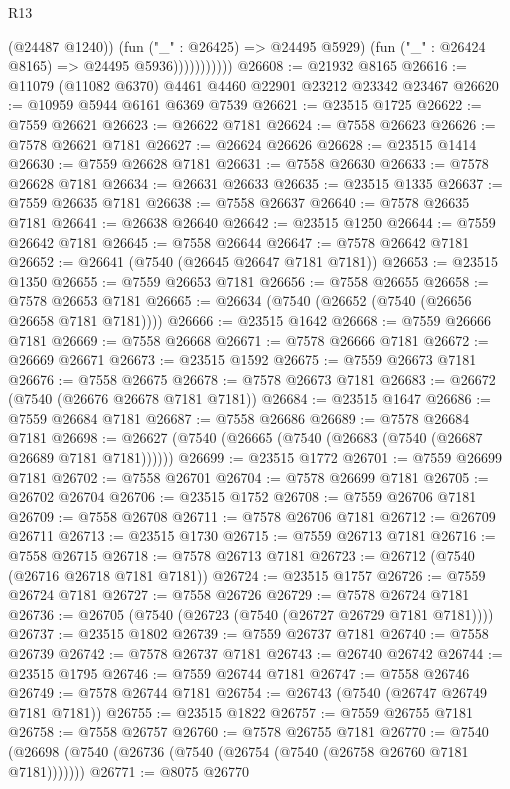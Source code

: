 \begin{lexlean}{R13}
\begin{coremodule}
                          (@24487 @1240))
                        (fun ("_" : @26425) => @24495 @5929)
                        (fun ("_" : @26424 @8165) => @24495 @5936)))))))))))
@26608 := @21932 @8165
@26616 := @11079 (@11082 @6370) @4461 @4460 @22901 @23212 @23342 @23467
@26620 := @10959 @5944 @6161 @6369 @7539
@26621 := @23515 @1725
@26622 := @7559 @26621
@26623 := @26622 @7181
@26624 := @7558 @26623
@26626 := @7578 @26621 @7181
@26627 := @26624 @26626
@26628 := @23515 @1414
@26630 := @7559 @26628 @7181
@26631 := @7558 @26630
@26633 := @7578 @26628 @7181
@26634 := @26631 @26633
@26635 := @23515 @1335
@26637 := @7559 @26635 @7181
@26638 := @7558 @26637
@26640 := @7578 @26635 @7181
@26641 := @26638 @26640
@26642 := @23515 @1250
@26644 := @7559 @26642 @7181
@26645 := @7558 @26644
@26647 := @7578 @26642 @7181
@26652 := @26641 (@7540 (@26645 @26647 @7181 @7181))
@26653 := @23515 @1350
@26655 := @7559 @26653 @7181
@26656 := @7558 @26655
@26658 := @7578 @26653 @7181
@26665 := @26634 (@7540 (@26652 (@7540 (@26656 @26658 @7181 @7181))))
@26666 := @23515 @1642
@26668 := @7559 @26666 @7181
@26669 := @7558 @26668
@26671 := @7578 @26666 @7181
@26672 := @26669 @26671
@26673 := @23515 @1592
@26675 := @7559 @26673 @7181
@26676 := @7558 @26675
@26678 := @7578 @26673 @7181
@26683 := @26672 (@7540 (@26676 @26678 @7181 @7181))
@26684 := @23515 @1647
@26686 := @7559 @26684 @7181
@26687 := @7558 @26686
@26689 := @7578 @26684 @7181
@26698 := @26627 (@7540 (@26665 (@7540 (@26683 (@7540 (@26687 @26689 @7181 @7181))))))
@26699 := @23515 @1772
@26701 := @7559 @26699 @7181
@26702 := @7558 @26701
@26704 := @7578 @26699 @7181
@26705 := @26702 @26704
@26706 := @23515 @1752
@26708 := @7559 @26706 @7181
@26709 := @7558 @26708
@26711 := @7578 @26706 @7181
@26712 := @26709 @26711
@26713 := @23515 @1730
@26715 := @7559 @26713 @7181
@26716 := @7558 @26715
@26718 := @7578 @26713 @7181
@26723 := @26712 (@7540 (@26716 @26718 @7181 @7181))
@26724 := @23515 @1757
@26726 := @7559 @26724 @7181
@26727 := @7558 @26726
@26729 := @7578 @26724 @7181
@26736 := @26705 (@7540 (@26723 (@7540 (@26727 @26729 @7181 @7181))))
@26737 := @23515 @1802
@26739 := @7559 @26737 @7181
@26740 := @7558 @26739
@26742 := @7578 @26737 @7181
@26743 := @26740 @26742
@26744 := @23515 @1795
@26746 := @7559 @26744 @7181
@26747 := @7558 @26746
@26749 := @7578 @26744 @7181
@26754 := @26743 (@7540 (@26747 @26749 @7181 @7181))
@26755 := @23515 @1822
@26757 := @7559 @26755 @7181
@26758 := @7558 @26757
@26760 := @7578 @26755 @7181
@26770 := @7540 (@26698 (@7540 (@26736 (@7540 (@26754 (@7540 (@26758 @26760 @7181 @7181)))))))
@26771 := @8075 @26770

\end{coremodule}
\end{lexlean}
